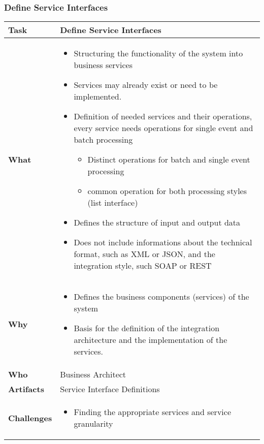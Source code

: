 \subsubsection{Define Service Interfaces}
\begin{tabularx}{\textwidth}{@{} l X @{}}
	\caption{Define Service Interfaces} \label{table:ch6_Task_Define_Service_Interfaces}\\
	\toprule
	\bfseries Task & Define Service Interfaces\\
	\midrule\bfseries What & 
	\begin{itemize}
		\item Structuring the functionality of the system into business services
		\item Services may already exist or need to be implemented.
		\item Definition of needed services and their operations, every service needs operations for single event and batch processing
		\begin{itemize}
			\item Distinct operations for batch and single event processing
			\item common operation for both processing styles (list interface)
		\end{itemize}
		\item Defines the structure of input and output data
		\item Does not include informations about the technical format, such as \ac{XML} or \ac{JSON}, and the integration style, such SOAP or \ac{REST}
	\end{itemize}
	\\
	\midrule
	\bfseries Why &
	\begin{itemize}
		\item Defines the business components (services) of the system
		\item Basis for the definition of the integration architecture and the implementation of the services.
	\end{itemize}\\
	\midrule
	\bfseries Who & Business Architect\\
	\midrule
	\bfseries Artifacts & Service Interface Definitions\\
	\midrule
	\bfseries Challenges & 
	\begin{itemize}
		\item Finding the appropriate services and service granularity
	\end{itemize}\\
	\bottomrule
\end{tabularx}


